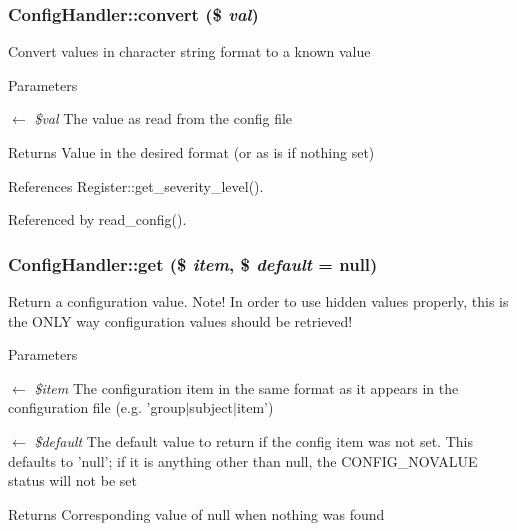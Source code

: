 \subsubsection[{convert}]{\setlength{\rightskip}{0pt plus 5cm}ConfigHandler::convert (\$ {\em val})}\label{classConfigHandler_adf3dd923bfd38e0274dc86ebd0caed92}
Convert values in character string format to a known value


\begin{DoxyParams}{Parameters}
\item[\mbox{$\leftarrow$} {\em \$val}]The value as read from the config file \end{DoxyParams}
\begin{DoxyReturn}{Returns}
Value in the desired format (or as is if nothing set) 
\end{DoxyReturn}


References Register::get\_\-severity\_\-level().



Referenced by read\_\-config().

\subsubsection[{get}]{\setlength{\rightskip}{0pt plus 5cm}ConfigHandler::get (\$ {\em item}, \/  \$ {\em default} = {\ttfamily null})}\label{classConfigHandler_ab8a7633a5a352c40d5c1380e04ffd199}
Return a configuration value. Note! In order to use hidden values properly, this is the ONLY way configuration values should be retrieved!


\begin{DoxyParams}{Parameters}
\item[\mbox{$\leftarrow$} {\em \$item}]The configuration item in the same format as it appears in the configuration file (e.g. 'group$|$subject$|$item') \item[\mbox{$\leftarrow$} {\em \$default}]The default value to return if the config item was not set. This defaults to 'null'; if it is anything other than null, the CONFIG\_\-NOVALUE status will not be set \end{DoxyParams}
\begin{DoxyReturn}{Returns}
Corresponding value of null when nothing was found 
\end{DoxyReturn}


